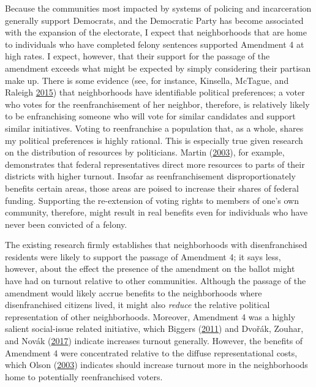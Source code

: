 \documentclass[
  12pt,
]{article}
\begin{document}
Because the communities most impacted by systems of policing and incarceration generally support Democrats, and the Democratic Party has become associated with the expansion of the electorate, I expect that neighborhoods that are home to individuals who have completed felony sentences supported Amendment 4 at high rates. I expect, however, that their support for the passage of the amendment exceeds what might be expected by simply considering their partisan make up. There is some evidence (see, for instance, Kinsella, McTague, and Raleigh \protect\hyperlink{ref-Kinsella2015}{2015}) that neighborhoods have identifiable political preferences; a voter who votes for the reenfranchisement of her neighbor, therefore, is relatively likely to be enfranchising someone who will vote for similar candidates and support similar initiatives. Voting to reenfranchise a population that, as a whole, shares my political preferences is highly rational. This is especially true given research on the distribution of resources by politicians. Martin (\protect\hyperlink{ref-Martin2003}{2003}), for example, demonstrates that federal representatives direct more resources to parts of their districts with higher turnout. Insofar as reenfranchisement disproportionately benefits certain areas, those areas are poised to increase their shares of federal funding. Supporting the re-extension of voting rights to members of one's own community, therefore, might result in real benefits even for individuals who have never been convicted of a felony.

The existing research firmly establishes that neighborhoods with disenfranchised residents were likely to support the passage of Amendment 4; it says less, however, about the effect the presence of the amendment on the ballot might have had on turnout relative to other communities. Although the passage of the amendment would likely accrue benefits to the neighborhoods where disenfranchised citizens lived, it might also \emph{reduce} the relative political representation of other neighborhoods. Moreover, Amendment 4 was a highly salient social-issue related initiative, which Biggers (\protect\hyperlink{ref-Biggers2011}{2011}) and Dvořák, Zouhar, and Novák (\protect\hyperlink{ref-Dvorak2017}{2017}) indicate increases turnout generally. However, the benefits of Amendment 4 were concentrated relative to the diffuse representational costs, which Olson (\protect\hyperlink{ref-Olson2003}{2003}) indicates should increase turnout more in the neighborhoods home to potentially reenfranchised voters.
\end{document}
